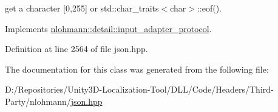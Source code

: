 get a character \mbox{[}0,255\mbox{]} or std\+::char\+\_\+traits$<$char$>$\+::eof(). 



Implements \mbox{\hyperlink{structnlohmann_1_1detail_1_1input__adapter__protocol_aac10a6a4048a8ce8e2ed50277692a3ca}{nlohmann\+::detail\+::input\+\_\+adapter\+\_\+protocol}}.



Definition at line 2564 of file json.\+hpp.



The documentation for this class was generated from the following file\+:\begin{DoxyCompactItemize}
\item 
D\+:/\+Repositories/\+Unity3\+D-\/\+Localization-\/\+Tool/\+D\+L\+L/\+Code/\+Headers/\+Third-\/\+Party/nlohmann/\mbox{\hyperlink{json_8hpp}{json.\+hpp}}\end{DoxyCompactItemize}
